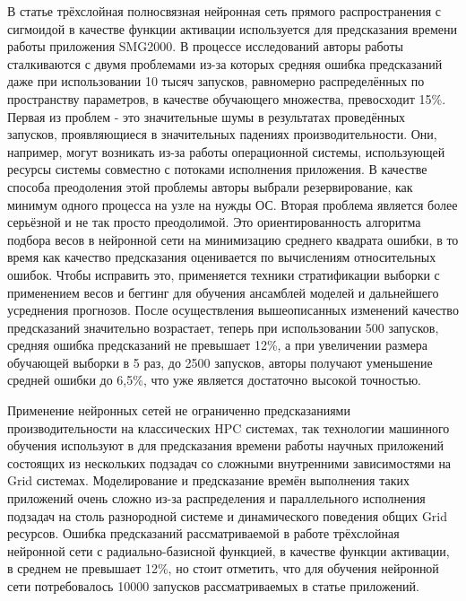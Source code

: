 		В статье \cite{ML_SMG2000} трёхслойная полносвязная нейронная сеть прямого распространения с сигмоидой в качестве функции активации используется для предсказания времени работы приложения SMG2000. В процессе исследований авторы работы сталкиваются с двумя проблемами из-за которых средняя ошибка предсказаний даже при использовании 10 тысяч запусков, равномерно распределённых по пространству параметров, в качестве обучающего множества, превосходит 15\%. Первая из проблем - это значительные шумы в результатах проведённых запусков, проявляющиеся в значительных падениях производительности. Они, например, могут возникать из-за работы операционной системы, использующей ресурсы системы совместно с потоками исполнения приложения. В качестве способа преодоления этой проблемы авторы выбрали резервирование, как минимум одного процесса на узле на нужды ОС. Вторая проблема является более серьёзной и не так просто преодолимой. Это ориентированность алгоритма подбора весов в нейронной сети на минимизацию среднего квадрата ошибки, в то время как качество предсказания оценивается по вычислениям относительных ошибок. Чтобы исправить это, применяется техники стратификации выборки с применением весов и беггинг для обучения ансамблей моделей и дальнейшего усреднения прогнозов. После осуществления вышеописанных изменений качество предсказаний значительно возрастает, теперь при использовании 500 запусков, средняя ошибка предсказаний не превышает 12\%, а при увеличении размера обучающей выборки в 5 раз, до 2500 запусков, авторы получают уменьшение средней ошибки до 6,5\%, что уже является достаточно высокой точностью.

		Применение нейронных сетей не ограниченно предсказаниями производительности на классических HPC системах, так технологии машинного обучения используют в \cite{ML_Grid} для предсказания времени работы научных приложений состоящих из нескольких подзадач со сложными внутренними зависимостями на Grid системах. Моделирование и предсказание времён выполнения таких приложений очень сложно из-за распределения и параллельного исполнения подзадач на столь разнородной системе и динамического поведения общих Grid ресурсов. Ошибка предсказаний рассматриваемой в работе трёхслойная нейронной сети с радиально-базисной функцией, в качестве функции активации, в среднем не превышает 12\%, но стоит отметить, что для обучения нейронной сети потребовалось 10000 запусков рассматриваемых в статье приложений.

